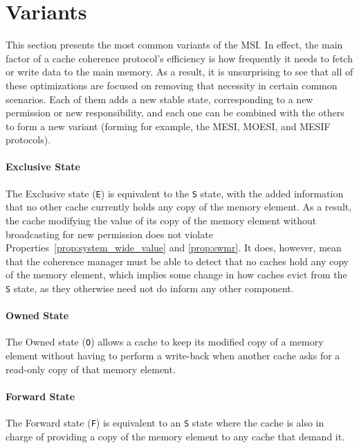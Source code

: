 \newpage{}
\section{Variants}
This section presents the most common variants of the MSI. In effect, the main
factor of a cache coherence protocol's efficiency is how frequently it needs to
fetch or write data to the main memory. As a result, it is unsurprising to see
that all of these optimizations are focused on removing that necessity in
certain common scenarios. Each of them adds a new stable state, corresponding
to a new permission or new responsibility, and each one can be combined with
the others to form a new variant (forming for example, the MESI, MOESI, and
MESIF protocols).

\paragraph{Exclusive State}
The Exclusive state (\texttt{E}) is equivalent to the \texttt{S} state, with the
added information that no other cache currently holds any copy of the memory
element. As a result, the cache modifying the value of its copy of the memory
element without broadcasting for new permission does not violate
Properties~\ref{prop:system_wide_value} and \ref{prop:swmr}. It does, however,
mean that the coherence manager must be able to detect that no caches hold any
copy of the memory element, which implies some change in how caches evict
from the \texttt{S} state, as they otherwise need not do inform any other
component.

\paragraph{Owned State}
The Owned state (\texttt{O}) allows a cache to keep its modified copy of a
memory element without having to perform a write-back when another cache asks
for a read-only copy of that memory element.

\paragraph{Forward State}
The Forward state (\texttt{F}) is equivalent to an \texttt{S} state where the
cache is also in charge of providing a copy of the memory element to any cache
that demand it.
